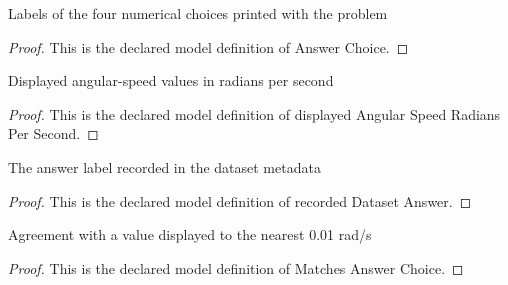 \begin{definition}
  \label{def:physics:phyx-mini-0278:phyxminiproblems-problemphyxmini0278-answerchoice}
  Labels of the four numerical choices printed with the problem
\end{definition}
\begin{proof}
  This is the declared model definition of Answer Choice.
\end{proof}
\begin{definition}
  \label{def:physics:phyx-mini-0278:phyxminiproblems-problemphyxmini0278-displayedangularspeedradianspersecond}
  Displayed angular-speed values in radians per second
\end{definition}
\begin{proof}
  This is the declared model definition of displayed Angular Speed Radians Per Second.
\end{proof}
\begin{definition}
  \label{def:physics:phyx-mini-0278:phyxminiproblems-problemphyxmini0278-recordeddatasetanswer}
  The answer label recorded in the dataset metadata
\end{definition}
\begin{proof}
  This is the declared model definition of recorded Dataset Answer.
\end{proof}
\begin{definition}
  \label{def:physics:phyx-mini-0278:phyxminiproblems-problemphyxmini0278-matchesanswerchoice}
  Agreement with a value displayed to the nearest 0.01 rad/s
\end{definition}
\begin{proof}
  This is the declared model definition of Matches Answer Choice.
\end{proof}
